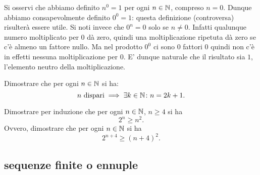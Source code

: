 Si osservi che abbiamo definito $n^0=1$ per ogni $n\in {\mathbb N}$,
compreso $n=0$. 
Dunque abbiamo consapevolmente definito $0^0=1$:
questa definizione (controversa) risulterà essere utile.
Si noti invece che $0^n=0$ solo se $n\neq 0$.
Infatti qualunque numero moltiplicato per $0$ dà zero, 
quindi una moltiplicazione ripetuta dà zero 
se c'è almeno un fattore nullo. 
Ma nel prodotto $0^0$ ci sono $0$ fattori $0$ quindi non c'è in effetti nessuna 
moltiplicazione per $0$. 
E' dunque naturale che il risultato sia $1$, 
l'elemento neutro della moltiplicazione.

\begin{exercise}
  Dimostrare che per ogni $n\in {\mathbb N}$ si ha:
  \[
    n \text{ dispari} \implies \exists k\in {\mathbb N}\colon n=2k+1.
  \]
\end{exercise}
  
\begin{exercise}
  Dimostrare per induzione che per ogni $n\in {\mathbb N}$, $n\ge 4$ si ha 
  \[  
    2^n \ge n^2.
  \]
  Ovvero, dimostrare che per ogni $n\in {\mathbb N}$ si ha 
  \[
    2^{n+4} \ge (n+4)^2.  
  \]
  \end{exercise}
  
\subsection{sequenze finite o ennuple}
%
%


